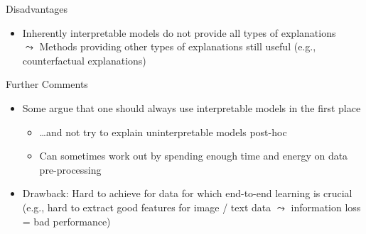 \documentclass[11pt,compress,t,notes=noshow, aspectratio=169, xcolor=table]{beamer}
\begin{document}
\begin{frame}{Disadvantages}
\begin{itemize}
     \item<4-> Inherently interpretable models do not provide all types of explanations
     \\
     $\leadsto$ Methods providing other types of explanations still useful (e.g., counterfactual explanations)
\end{itemize}
\end{frame}

\begin{frame}{Further Comments}

    \begin{itemize}
    \itemsep1em
        \item<1-> Some argue that one should always use interpretable models in the first place 
        \begin{itemize}
            \item \ldots and not try to explain uninterpretable models post-hoc
            \item Can sometimes work out by spending enough time and energy on data pre-processing %
        \end{itemize}
       \item<2->[$\leadsto$] Drawback: Hard to achieve for data for which end-to-end learning is crucial\\ 
        (e.g., hard to extract good features for image / text data $\leadsto$ information loss = bad performance)

\end{itemize}
\end{frame}
\end{document}
